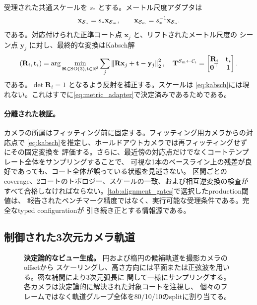 受理された共通スケールを \(s_*\) とする。メートル尺度アダプタは
\begin{equation}
  \mathbf{x}_{\mathcal{S}_n}=s_*\mathbf{x}_{\mathcal{S}_m},\qquad
  \mathbf{x}_{\mathcal{S}_m}=s_*^{-1}\mathbf{x}_{\mathcal{S}_n}.
  \label{eq:metric_adapter}
\end{equation}
である。対応付けられた正準コート点 \(\mathbf{x}_j\) と、リフトされたメートル尺度の
シーン点 \(\mathbf{y}_j\) に対し、最終的な変換はKabsch解
\begin{equation}
  (\mathbf{R}_i,\mathbf{t}_i)=
  \arg\min_{\mathbf{R}\in\mathrm{SO}(3),\mathbf{t}\in\mathbb{R}^3}
    \sum_j \left\|\mathbf{R}\mathbf{x}_j+\mathbf{t}-\mathbf{y}_j\right\|_2^2,
  \quad
  \mathbf{T}^{\mathcal{S}_m\leftarrow \mathcal{C}_i}=
  \begin{bmatrix}\mathbf{R}_i&\mathbf{t}_i\\\mathbf{0}^{\top}&1\end{bmatrix}.
  \label{eq:kabsch}
\end{equation}
である。\(\det\mathbf{R}_i=1\) となるよう反射を補正する。スケールは
\cref{eq:kabsch}には現れない。これはすでに\cref{eq:metric_adapter}で決定済みであるためである。

\paragraph{分離された検証。}
カメラの所属はフィッティング前に固定する。フィッティング用カメラからの対応点で
\cref{eq:kabsch}を推定し、ホールドアウトカメラでは再フィッティングせずにその固定変換を
評価する。さらに、最近傍の対応点だけでなくコートテンプレート全体をサンプリングすることで、
可視な1本のベースライン上の残差が良好であっても、コート全体が誤っている状態を見逃さない。
区間ごとのcoverage、2コートのトポロジー、スケールの一致、および相互逆変換の検査が
すべて合格しなければならない。\cref{tab:alignment_gates}で選択したproduction閾値は、
報告されたベンチマーク精度ではなく、実行可能な受理条件である。完全なtyped configurationが
引き続き正とする情報源である。



\subsection{制御された3次元カメラ軌道}
\label{sec:trajectories}

\begin{figure}[t]
  \centering
  \resizebox{\linewidth}{!}{}
  \caption{\textbf{決定論的なビュー生成。}  円および楕円の候補軌道を撮影カメラのoffsetから
  スケーリングし、高さ方向には平面または正弦波を用いる。密な補間により3次元弧長に
  関して一様にサンプリングする。各カメラは決定論的に解決された対象コートを注視し、
  個々のフレームではなく軌道グループ全体を80/10/10のsplitに割り当てる。}
  \label{fig:trajectories}
\end{figure}

